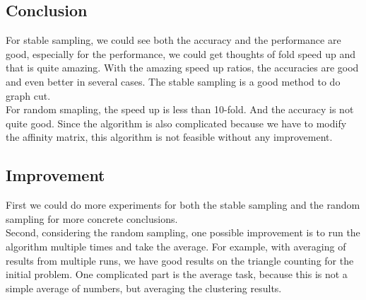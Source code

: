 \subsection{Conclusion}
For stable sampling, we could see both the accuracy and the performance are good, especially for the performance, we could get thoughts of fold speed up and that is quite amazing. With the amazing speed up ratios, the accuracies are good and even better in several cases. The stable sampling is a good method to do graph cut. \\
For random smapling, the speed up is less than 10-fold. And the accuracy is not quite good. Since the algorithm is also complicated because we have to modify the affinity matrix, this algorithm is not feasible without any improvement.

\subsection{Improvement}
First we could do more experiments for both the stable sampling and the random sampling for more concrete conclusions. \\
Second, considering the random sampling, one possible improvement is to run the algorithm multiple times and take the average. For example, with averaging of results from multiple runs, we have good results on the triangle counting for the initial problem. One complicated part is the average task, because this is not a simple average of numbers, but averaging the clustering results.
